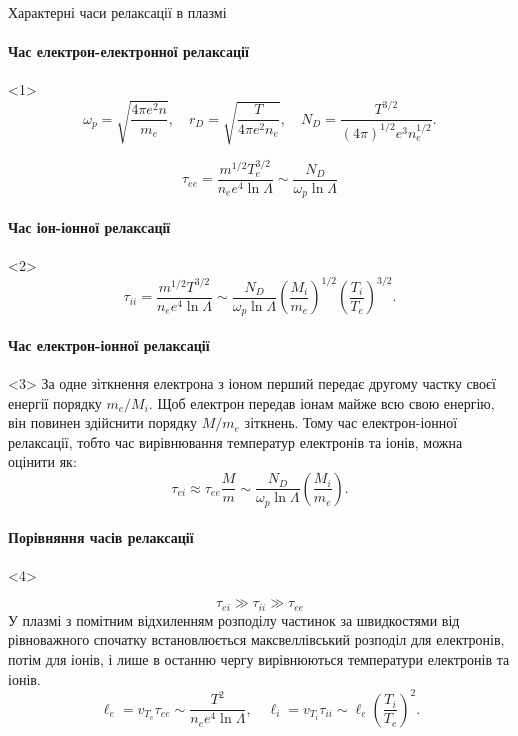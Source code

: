 \documentclass[]{beamer}
\begin{document}
\begin{frame}{Характерні часи релаксації в плазмі}{}
	\framesubtitle<1>{Час електрон-електронної релаксації}
	\begin{onlyenv}
		\begin{equation*}
			\omega_p = \sqrt{\frac{4\pi e^2n}{m_e}}, \quad r_D = \sqrt{\frac{T}{4\pi e^2n_e}}, \quad N_D = \frac{T^{3/2}}{(4\pi)^{1/2}e^3n_e^{1/2}}.
		\end{equation*}
		\begin{block}{}
			\begin{equation*}
				\tau_{ee} = \frac{m^{1/2}T_e^{3/2}}{n_e e^4\ln\Lambda} \sim \frac{N_D}{\omega_p\ln\Lambda}
			\end{equation*}
		\end{block}
	\end{onlyenv}
	\framesubtitle<2>{Час іон-іонної релаксації}
	\begin{onlyenv}
		\begin{equation*}
			\tau_{ii} = \frac{m^{1/2}T^{3/2}}{n_e e^4\ln\Lambda} \sim \frac{N_D}{\omega_p\ln\Lambda} \left(\frac{M_i}{m_e}\right)^{1/2}
			\left(\frac{T_i}{T_e}\right)^{3/2}.
		\end{equation*}
	\end{onlyenv}
	\framesubtitle<3>{Час електрон-іонної релаксації}
	\begin{onlyenv}
		За одне зіткнення електрона з іоном перший передає другому частку своєї енергії порядку $m_e/M_i$. Щоб електрон передав іонам майже всю свою енергію,
		він повинен здійснити порядку $M/m_e$ зіткнень. Тому час електрон-іонної релаксації, тобто час вирівнювання температур електронів та іонів, можна
		оцінити як:
		\begin{equation*}
			\tau_{ei} \approx \tau_{ee}\frac{M}{m} \sim \frac{N_D}{\omega_p\ln\Lambda} \left(\frac{M_i}{m_e}\right) .
		\end{equation*}
	\end{onlyenv}
	\framesubtitle<4>{Порівняння часів релаксації}
	\begin{onlyenv}
		\begin{block}{}\justifying
			\begin{equation*}
				\tau_{ei} \gg \tau_{ii} \gg \tau_{ee}
			\end{equation*}
			У плазмі з помітним відхиленням розподілу частинок за швидкостями від рівноважного спочатку  встановлюється максвеллівський розподіл для
			електронів, потім для іонів, і лише в останню чергу вирівнюються температури електронів та іонів.
			\begin{equation*}
				\ell_e = v_{T_e} \tau_{ee} \sim \frac{T^2}{n_ee^4 \ln\Lambda}, \quad
				\ell_i =  v_{T_i} \tau_{ii} \sim \ell_e \left( \frac{T_i}{T_e} \right)^2 .
			\end{equation*}


\end{block}
\end{onlyenv}
\end{frame}
\end{document}
